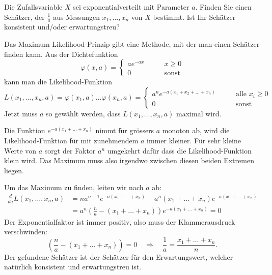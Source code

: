 Die Zufallsvariable $X$ sei exponentialverteilt mit Parameter $a$.
Finden Sie einen Schätzer, der $\frac1a$ aus Messungen $x_1,\dots,x_n$
von $X$ bestimmt. Ist Ihr Schätzer konsistent und/oder erwartungstreu?


\begin{loesung}
Das Maximum Likelihood-Prinzip gibt eine Methode, mit der man einen
Schätzer finden kann. Aus der Dichtefunktion
\[
\varphi(x,a)=\begin{cases}
ae^{-ax}&\qquad x \ge 0\\
0&\qquad\text{sonst}
\end{cases}
\]
kann man die Likelihood-Funktion
\[
L(x_1,\dots,x_n,a)=\varphi(x_1,a)\dots\varphi(x_n,a)=
\begin{cases}
a^ne^{-a(x_1+x_2+\dots+x_n)}&\qquad \text{alle $x_i \ge 0$}\\
0&\qquad\text{sonst}
\end{cases}
\]
Jetzt muss $a$ so gewählt werden, dass $L(x_1,\dots,x_n,a)$
maximal wird.

Die Funktion $e^{-a(x_1+\dots+x_n)}$ nimmt für grössers $a$ monoton ab,
wird die Likelihood-Funktion für mit zunehmendem $a$ immer kleiner. Für
sehr kleine Werte von $a$ sorgt der Faktor $a^n$ umgekehrt dafür dass
die Likelihood-Funktion klein wird. Das Maximum muss also irgendwo
zwischen diesen beiden Extremen liegen.

Um das Maximum zu finden, leiten wir nach $a$ ab:
\begin{align*}
\frac{d}{da}L(x_1,\dots,x_n,a)&=na^{n-1}e^{-a(x_1+\dots+x_n)}-a^n(x_1+\dots+x_n)e^{-a(x_1+\dots+x_n)}\\
&=a^n
\left(\frac{n}a-(x_1+\dots+x_n)\right)
e^{-a(x_1+\dots+x_n)}=0
\end{align*}
Der Exponentialfaktor ist immer positiv, also muss der Klammerausdruck
verschwinden:
\[
\left(\frac{n}a-(x_1+\dots+x_n)\right)=0
\quad\Rightarrow\quad
\frac1a=\frac{x_1+\dots+x_n}{n}.
\]
Der gefundene Schätzer ist der Schätzer für den Erwartungswert,
welcher natürlich konsistent und erwartungstreu ist.
\end{loesung}

